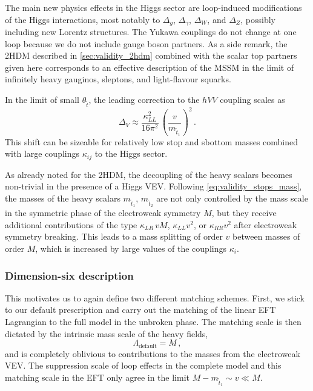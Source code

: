 The main new physics effects in the Higgs sector are loop-induced
modifications of the Higgs interactions, most notably to $\Delta_g$,
$\Delta_\gamma$, $\Delta_W$, and $\Delta_Z$, possibly including new
Lorentz structures. The Yukawa couplings do not change at one loop
because we do not include gauge boson partners. As a side remark, the
2HDM described in \autoref{sec:validity_2hdm} combined with the scalar
top partners given here corresponds to an effective description of the
MSSM in the limit of infinitely heavy gauginos, sleptons, and
light-flavour squarks.

In the limit of small $\theta_{\tilde{t}}$, the leading correction to
the $hVV$ coupling scales as
%
\begin{equation}
  \Delta_V
  \approx
  \frac{\kappa_{LL}^2}{16 \pi^2} \, \left( \frac{v}{m_{\tilde{t}_{1}}} \right)^2 \,.
  \label{eq:validity_stops_couplings}
\end{equation}
%
This shift can be sizeable for relatively low stop and sbottom masses
combined with large couplings $\kappa_{ij}$ to the Higgs sector.

As already noted for the 2HDM, the decoupling of the heavy scalars
becomes non-trivial in the presence of a Higgs VEV. Following
\autoref{eq:validity_stops_mass}, the masses of the heavy scalars
$m_{\tilde{t}_1}$, $m_{\tilde{t}_2}$ are not only controlled by the
mass scale in the symmetric phase of the electroweak symmetry $M$, but
they receive additional contributions of the type $\kappa_{LR} \, vM$,
$\kappa_{LL} v^2$, or $\kappa_{RR} v^2$ after electroweak symmetry
breaking. This leads to a mass splitting of order $v$ between masses
of order $M$, which is increased by large values of the couplings
$\kappa_{i}$.
%



\subsubsection{Dimension-six description}

This motivates us to again define two different matching
schemes. First, we stick to our default prescription and carry out the
matching of the linear EFT Lagrangian to the full model in the
unbroken phase. The matching scale is then dictated by the intrinsic
mass scale of the heavy fields,
%
\begin{equation}
  \Lambda_{\text{default}} = M \,,
\end{equation}
%
and is completely oblivious to contributions to the masses from the
electroweak VEV. The suppression scale of loop effects in the complete
model and this matching scale in the EFT only agree in the limit
$M - m_{\tilde{t}_{1}} \sim v \ll M$.


